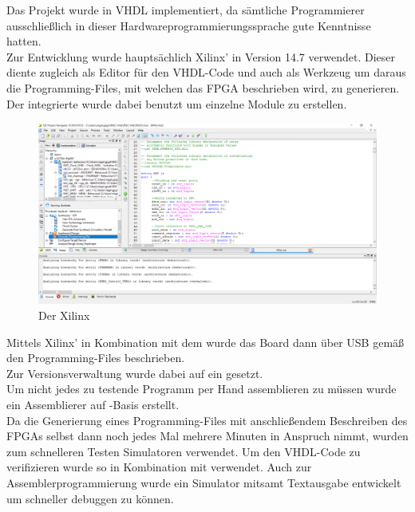 Das Projekt wurde in VHDL implementiert, da s\"amtliche Programmierer ausschlie{\ss}lich in dieser Hardwareprogrammierungssprache gute Kenntnisse hatten.\\
Zur Entwicklung wurde haupts\"achlich Xilinx'  in Version 14.7 verwendet. Dieser diente zugleich als Editor f\"ur den VHDL-Code und auch als Werkzeug um daraus die Programming-Files, mit welchen das FPGA beschrieben wird, zu generieren. Der integrierte  wurde dabei benutzt um einzelne Module zu erstellen.\\
\begin{figure}[H]
	\centering
		\includegraphics[width=1.0\textwidth]{ISE.png}
	\caption{Der Xilinx }
	\label{fig:tool}
\end{figure}
Mittels Xilinx'  in Kombination mit dem  wurde das Board dann \"uber USB gem\"a{\ss} den Programming-Files beschrieben.\\
Zur Versionsverwaltung wurde dabei auf ein  gesetzt.\\ 
Um nicht jedes zu testende Programm per Hand assemblieren zu m\"ussen wurde ein Assemblierer auf -Basis erstellt.\\
Da die Generierung eines Programming-Files mit anschlie{\ss}endem Beschreiben des FPGAs selbst dann noch jedes Mal mehrere Minuten in Anspruch nimmt, wurden zum schnelleren Testen Simulatoren verwendet. Um den VHDL-Code zu verifizieren wurde so  in Kombination mit  verwendet. Auch zur Assemblerprogrammierung wurde ein Simulator mitsamt Textausgabe entwickelt um schneller debuggen zu k\"onnen.
